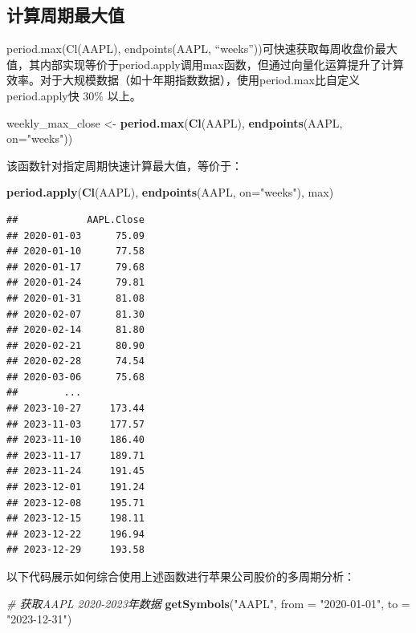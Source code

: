 \documentclass[]{ctexbook}
\newenvironment{Shaded}{\begin{snugshade}}{\end{snugshade}}
\newcommand{\AttributeTok}[1]{\textcolor[rgb]{0.13,0.29,0.53}{#1}}
\newcommand{\CommentTok}[1]{\textcolor[rgb]{0.56,0.35,0.01}{\textit{#1}}}
\newcommand{\FunctionTok}[1]{\textcolor[rgb]{0.13,0.29,0.53}{\textbf{#1}}}
\newcommand{\NormalTok}[1]{#1}
\newcommand{\OtherTok}[1]{\textcolor[rgb]{0.56,0.35,0.01}{#1}}
\newcommand{\StringTok}[1]{\textcolor[rgb]{0.31,0.60,0.02}{#1}}
\begin{document}
\subsection{计算周期最大值}\label{ux8ba1ux7b97ux5468ux671fux6700ux5927ux503c}

period.max(Cl(AAPL), endpoints(AAPL, ``weeks''))可快速获取每周收盘价最大值，其内部实现等价于period.apply调用max函数，但通过向量化运算提升了计算效率。对于大规模数据（如十年期指数数据），使用period.max比自定义period.apply快 30\% 以上。

\begin{Shaded}
\begin{Highlighting}[]
\NormalTok{weekly\_max\_close }\OtherTok{\textless{}{-}} \FunctionTok{period.max}\NormalTok{(}\FunctionTok{Cl}\NormalTok{(AAPL), }\FunctionTok{endpoints}\NormalTok{(AAPL, }\AttributeTok{on=}\StringTok{"weeks"}\NormalTok{))}
\end{Highlighting}
\end{Shaded}

该函数针对指定周期快速计算最大值，等价于：

\begin{Shaded}
\begin{Highlighting}[]
\FunctionTok{period.apply}\NormalTok{(}\FunctionTok{Cl}\NormalTok{(AAPL), }\FunctionTok{endpoints}\NormalTok{(AAPL, }\AttributeTok{on=}\StringTok{"weeks"}\NormalTok{), max)}
\end{Highlighting}
\end{Shaded}

\begin{verbatim}
##            AAPL.Close
## 2020-01-03      75.09
## 2020-01-10      77.58
## 2020-01-17      79.68
## 2020-01-24      79.81
## 2020-01-31      81.08
## 2020-02-07      81.30
## 2020-02-14      81.80
## 2020-02-21      80.90
## 2020-02-28      74.54
## 2020-03-06      75.68
##        ...           
## 2023-10-27     173.44
## 2023-11-03     177.57
## 2023-11-10     186.40
## 2023-11-17     189.71
## 2023-11-24     191.45
## 2023-12-01     191.24
## 2023-12-08     195.71
## 2023-12-15     198.11
## 2023-12-22     196.94
## 2023-12-29     193.58
\end{verbatim}

以下代码展示如何综合使用上述函数进行苹果公司股价的多周期分析：

\begin{Shaded}
\begin{Highlighting}[]
\CommentTok{\# 获取AAPL 2020{-}2023年数据}
\FunctionTok{getSymbols}\NormalTok{(}\StringTok{"AAPL"}\NormalTok{, }\AttributeTok{from =} \StringTok{"2020{-}01{-}01"}\NormalTok{, }\AttributeTok{to =} \StringTok{"2023{-}12{-}31"}\NormalTok{)}
\end{Highlighting}
\end{Shaded}
\end{document}
